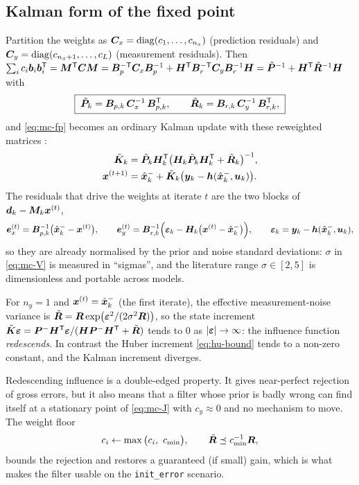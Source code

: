 \subsection{Kalman form of the fixed point}
Partition the weights as $\bm{C}_x=\operatorname{diag}(c_1,\dots,c_{n_x})$ (prediction residuals) and
$\bm{C}_y=\operatorname{diag}(c_{n_x+1},\dots,c_{L})$ (measurement residuals).  Then
$\sum_i c_i\bm{b}_i\bm{b}_i^{\mathsf{T}}=\bm{M}^{\mathsf{T}}\bm{C}\bm{M}
=\bm{B}_p^{-\mathsf{T}}\bm{C}_x\bm{B}_p^{-1}+\bm{H}^{\mathsf{T}}\bm{B}_r^{-\mathsf{T}}\bm{C}_y\bm{B}_r^{-1}\bm{H}
=\tilde{\bm{P}}^{-1}+\bm{H}^{\mathsf{T}}\tilde{\bm{R}}^{-1}\bm{H}$ with
\begin{equation}
\boxed{\;\tilde{\bm{P}}_k = \bm{B}_{p,k}\,\bm{C}_x^{-1}\,\bm{B}_{p,k}^{\mathsf{T}},\qquad
        \tilde{\bm{R}}_k = \bm{B}_{r,k}\,\bm{C}_y^{-1}\,\bm{B}_{r,k}^{\mathsf{T}},\;}
\label{eq:mc-tilde}
\end{equation}
and \eqref{eq:mc-fp} becomes an ordinary Kalman update with these reweighted matrices
\cite[Theorem~1]{chen2017mckf}:
\begin{align}
\tilde{\bm{K}}_k &= \tilde{\bm{P}}_k\bm{H}_k^{\mathsf{T}}\big(\bm{H}_k\tilde{\bm{P}}_k\bm{H}_k^{\mathsf{T}}+\tilde{\bm{R}}_k\big)^{-1},
   \label{eq:mc-K}\\
\bm{x}^{(t+1)} &= \hat{\bm{x}}^{-}_k+\tilde{\bm{K}}_k\big(\bm{y}_k-\bm{h}(\hat{\bm{x}}^{-}_k,\bm{u}_k)\big).
   \label{eq:mc-x}
\end{align}
The residuals that drive the weights at iterate $t$ are the two blocks of
$\bm{d}_k-\bm{M}_k\bm{x}^{(t)}$,
\begin{equation}
\bm{e}_x^{(t)}=\bm{B}_{p,k}^{-1}\big(\hat{\bm{x}}^{-}_k-\bm{x}^{(t)}\big),
\qquad
\bm{e}_y^{(t)}=\bm{B}_{r,k}^{-1}\Big(\bm{\varepsilon}_k-\bm{H}_k\big(\bm{x}^{(t)}-\hat{\bm{x}}^{-}_k\big)\Big),
\qquad \bm{\varepsilon}_k=\bm{y}_k-\bm{h}(\hat{\bm{x}}^{-}_k,\bm{u}_k),
\label{eq:mc-res}
\end{equation}
so they are already normalised by the prior and noise standard deviations: $\sigma$ in
\eqref{eq:mc-V} is measured in ``sigmas'', and the literature range $\sigma\in[2,5]$ is
dimensionless and portable across models.

\begin{proposition}\label{prop:mc-redesc}
For $n_y=1$ and $\bm{x}^{(t)}=\hat{\bm{x}}^{-}_k$ (the first iterate), the effective measurement-noise
variance is
$\tilde{\bm{R}}=\bm{R}\exp\!\big(\bm{\varepsilon}^2/(2\sigma^2\bm{R})\big)$, so the state increment
$\tilde{\bm{K}}\bm{\varepsilon} = \bm{P}^{-}\bm{H}^{\mathsf{T}}\bm{\varepsilon}/(\bm{H}\bm{P}^{-}\bm{H}^{\mathsf{T}}+\tilde{\bm{R}})$ tends to $0$ as
$|\bm{\varepsilon}|\to\infty$: the influence function \emph{redescends}.  In contrast the Huber increment
\eqref{eq:hu-bound} tends to a non-zero constant, and the Kalman increment diverges.
\end{proposition}
\noindent Redescending influence is a double-edged property.  It gives near-perfect rejection of
gross errors, but it also means that a filter whose prior is badly wrong can find itself at a
stationary point of \eqref{eq:mc-J} with $c_y\approx0$ and no mechanism to move.  The weight floor
\begin{equation}
c_i \leftarrow \max\big(c_i,\ c_{\min}\big),\qquad \tilde{\mR}\preceq c_{\min}^{-1}\mR,
\label{eq:mc-floor}
\end{equation}
bounds the rejection and restores a guaranteed (if small) gain, which is what makes the filter
usable on the \texttt{init\_error} scenario.

